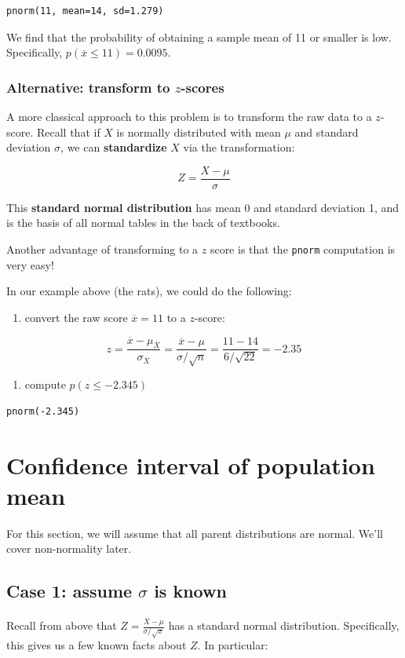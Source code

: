 \documentclass[11pt]{article}
\begin{document}
\begin{verbatim}
pnorm(11, mean=14, sd=1.279)
\end{verbatim}

We find that the probability of obtaining a sample mean of 11 or smaller is low.  Specifically, $p(\overline{x}\leq 11)=0.0095$.

\subsubsection*{Alternative: transform to $z$-scores}
\label{sec-1-2-1}
A more classical approach to this problem is to transform the raw data to a $z$-score.  Recall that if $X$ is normally distributed with mean $\mu$ and standard deviation $\sigma$, we can \textbf{standardize} $X$ via the transformation:

\[
Z=\frac{X-\mu}{\sigma}
\]

This \textbf{standard normal distribution} has mean 0 and standard deviation 1, and is the basis of all normal tables in the back of textbooks.

Another advantage of transforming to a $z$ score is that the \texttt{pnorm} computation is very easy!

In our example above (the rats), we could do the following:

\begin{enumerate}
\item convert the raw score $\overline{x}=11$ to a $z$-score:
\end{enumerate}

\[
z=\frac{\overline{x}-\mu_{\overline{X}}}{\sigma_{\overline{X}}}=\frac{\overline{x}-\mu}{\sigma/\sqrt{n}} = \frac{11-14}{6/\sqrt{22}} = -2.35
\]

\begin{enumerate}
\item compute $p(z\leq -2.345)$
\end{enumerate}

\begin{verbatim}
pnorm(-2.345)
\end{verbatim}

\section*{Confidence interval of population mean}
\label{sec-2}
For this section, we will assume that all parent distributions are normal.  We'll cover non-normality later.

\subsection*{Case 1: assume $\sigma$ is known}
\label{sec-2-1}
Recall from above that $Z=\frac{\overline{X}-\mu}{\sigma/\sqrt{x}}$ has a standard normal distribution.  Specifically, this gives us a few known facts about $Z$.  In particular:
\end{document}
